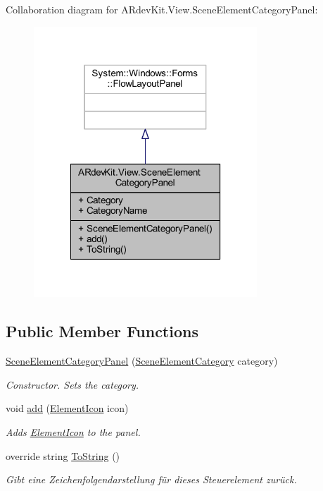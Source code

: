 Collaboration diagram for A\-Rdev\-Kit.\-View.\-Scene\-Element\-Category\-Panel\-:
\nopagebreak
\begin{figure}[H]
\begin{center}
\leavevmode
\includegraphics[width=238pt]{class_a_rdev_kit_1_1_view_1_1_scene_element_category_panel__coll__graph}
\end{center}
\end{figure}
\subsection*{Public Member Functions}
\begin{DoxyCompactItemize}
\item 
\hyperlink{class_a_rdev_kit_1_1_view_1_1_scene_element_category_panel_ad447d61535ff1dcae31ef5df7e8e694a}{Scene\-Element\-Category\-Panel} (\hyperlink{class_a_rdev_kit_1_1_controller_1_1_editor_controller_1_1_scene_element_category}{Scene\-Element\-Category} category)
\begin{DoxyCompactList}\small\item\em Constructor. Sets the category. \end{DoxyCompactList}\item 
void \hyperlink{class_a_rdev_kit_1_1_view_1_1_scene_element_category_panel_ac56ee87adf54f5e9d2148ce976aa008b}{add} (\hyperlink{class_a_rdev_kit_1_1_view_1_1_element_icon}{Element\-Icon} icon)
\begin{DoxyCompactList}\small\item\em Adds \hyperlink{class_a_rdev_kit_1_1_view_1_1_element_icon}{Element\-Icon} to the panel. \end{DoxyCompactList}\item 
override string \hyperlink{class_a_rdev_kit_1_1_view_1_1_scene_element_category_panel_adb2eafc0c9642204181bc1c5e8ae3af9}{To\-String} ()
\begin{DoxyCompactList}\small\item\em Gibt eine Zeichenfolgendarstellung für dieses Steuerelement zurück. \end{DoxyCompactList}\end{DoxyCompactItemize}
